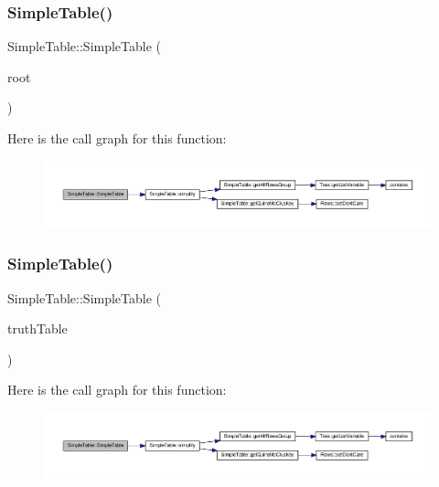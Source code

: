 \subsubsection{\texorpdfstring{Simple\+Table()}{SimpleTable()}\hspace{0.1cm}{\footnotesize\ttfamily [3/4]}}
{\footnotesize\ttfamily Simple\+Table\+::\+Simple\+Table (\begin{DoxyParamCaption}\item[{shared\+\_\+ptr$<$ \hyperlink{class_node}{Node} $>$}]{root }\end{DoxyParamCaption})\hspace{0.3cm}{\ttfamily [explicit]}}

Here is the call graph for this function\+:\nopagebreak
\begin{figure}[H]
\begin{center}
\leavevmode
\includegraphics[width=350pt]{d0/d52/class_simple_table_afcdfe80e8f2ed145c0baa2cb15722a22_cgraph}
\end{center}
\end{figure}
\mbox{\label{class_simple_table_a8f2eda31cbfffcafd9e12c7b55ca2dec}} 
\subsubsection{\texorpdfstring{Simple\+Table()}{SimpleTable()}\hspace{0.1cm}{\footnotesize\ttfamily [4/4]}}
{\footnotesize\ttfamily Simple\+Table\+::\+Simple\+Table (\begin{DoxyParamCaption}\item[{\hyperlink{class_truth_table}{Truth\+Table}}]{truth\+Table }\end{DoxyParamCaption})\hspace{0.3cm}{\ttfamily [explicit]}}

Here is the call graph for this function\+:\nopagebreak
\begin{figure}[H]
\begin{center}
\leavevmode
\includegraphics[width=350pt]{d0/d52/class_simple_table_a8f2eda31cbfffcafd9e12c7b55ca2dec_cgraph}
\end{center}
\end{figure}


